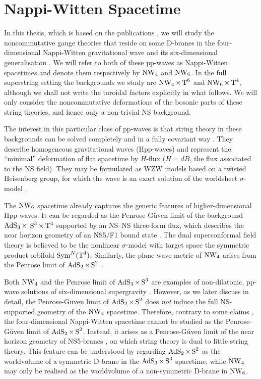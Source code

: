 \section{Nappi-Witten Spacetime}
\label{sec:i:nw}

In this thesis, which is based on the publications \cite{Halliday:2005zt,
  Halliday:2006qc}, we will study the noncommutative gauge theories that reside
on some D-branes in the four-dimensional Nappi-Witten gravitational wave
\cite{NW1} and its six-dimensional generalisation \cite{KM1}. We will refer to
both of these pp-waves as Nappi-Witten spacetimes and denote them respectively
by $\operatorname{NW}_4$ and $\operatorname{NW}_6$. In the full superstring setting the backgrounds we study
are $\operatorname{NW}_4\times\operatorname{T}^6$ and $\operatorname{NW}_6\times\operatorname{T}^4$, although we shall not write
the toroidal factors explicitly in what follows. We will only consider the
noncommutative deformations of the bosonic parts of these string theories, and
hence only a non-trivial NS background.

The interest in this particular class of pp-waves is that string theory in these
backgrounds can be solved completely and in a fully covariant way
\cite{BAKZ1,CFS1,DAK1,FHHP1,KK1,KKL1,RT2}. They describe homogeneous
gravitational waves (Hpp-waves) and represent the ``minimal'' deformation of
flat spacetime by $H$-flux ($H=dB$, the flux associated to the NS field). They
may be formulated as WZW models based on a twisted Heisenberg group, for which
the wave is an exact solution of the worldsheet $\sigma$-model \cite{KM1,NW1}.

The $\operatorname{NW}_6$ spacetime already captures the generic features of
higher-dimensional Hpp-waves. It can be regarded as the Penrose-G\"uven limit of
the background $\operatorname{AdS}_3\times$ $\operatorname{S}^3\times\operatorname{T}^4$ \cite{BFP1,BFHP1} supported
by an NS--NS three-form flux, which describes the near horizon geometry of an
NS5/F1 bound state \cite{GKS1}. The dual superconformal field theory is believed
to be the nonlinear $\sigma$-model with target space the symmetric product
orbifold ${\rm Sym}^N(\operatorname{T}^4)$. Similarly, the plane wave metric of $\operatorname{NW}_4$
arises from the Penrose limit of $\operatorname{AdS}_2\times\operatorname{S}^2$ \cite{BFP1,BFHP1}.

Both $\operatorname{NW}_4$ and the Penrose limit of $\operatorname{AdS}_3\times\operatorname{S}^3$ are examples of
non-dilatonic, pp-wave solutions of six-dimensional supergravity \cite{SS-J1}.
However, as we later discuss in detail, the Penrose-G\"uven limit of
$\operatorname{AdS}_2\times\operatorname{S}^2$ does {\it not} induce the full NS-supported geometry of the
$\operatorname{NW}_4$ spacetime. Therefore, contrary to some claims \cite{DeKa1,SF1}, the
four-dimensional Nappi-Witten spacetime cannot be studied as the Penrose-G\"uven
limit of $\operatorname{AdS}_2\times\operatorname{S}^2$. Instead, it arises as a Penrose-G\"uven limit of
the near horizon geometry of NS5-branes \cite{GO1}, on which string theory is
dual to little string theory. This feature can be understood by regarding
$\operatorname{AdS}_2\times\operatorname{S}^2$ as the worldvolume of a symmetric D-brane in the
$\operatorname{AdS}_3\times\operatorname{S}^3$ spacetime, while $\operatorname{NW}_4$ may only be realised as the
worldvolume of a non-symmetric D-brane in $\operatorname{NW}_6$.

